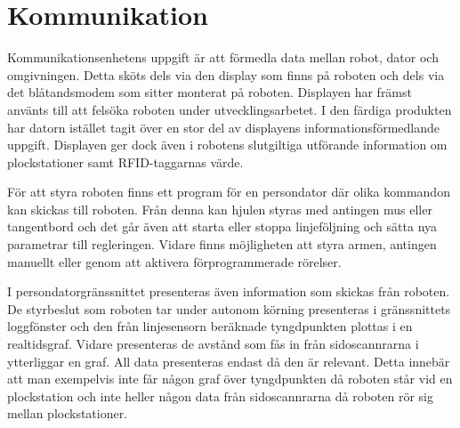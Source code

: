

\section{Kommunikation}

Kommunikationsenhetens uppgift är att förmedla data mellan robot, dator och omgivningen. Detta sköts dels via den display som finns på roboten och dels via det blåtandsmodem som sitter monterat på roboten. Displayen har främst använts till att felsöka roboten under utvecklingsarbetet. I den färdiga produkten har datorn istället tagit över en stor del av displayens informationsförmedlande uppgift. Displayen ger dock även i robotens slutgiltiga utförande information om plockstationer samt RFID-taggarnas värde.

För att styra roboten finns ett program för en persondator där olika kommandon kan skickas till roboten. Från denna kan hjulen styras med antingen mus eller tangentbord och det går även att starta eller stoppa linjeföljning och sätta nya parametrar till regleringen. Vidare finns möjligheten att styra armen, antingen manuellt eller genom att aktivera förprogrammerade rörelser.

I persondatorgränssnittet presenteras även information som skickas från roboten. De styrbeslut som roboten tar under autonom körning presenteras i gränssnittets loggfönster och den från linjesensorn beräknade tyngdpunkten plottas i en realtidsgraf. Vidare presenteras de avstånd som fås in från sidoscannrarna i ytterliggar en graf. All data presenteras endast då den är relevant. Detta innebär att man exempelvis inte får någon graf över tyngdpunkten då roboten står vid en plockstation och inte heller någon data från sidoscannrarna då roboten rör sig mellan plockstationer.





